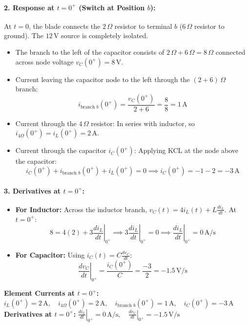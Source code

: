 \documentclass[11pt,a4paper,oneside]{article}
\begin{document}
\paragraph{2. Response at $t = 0^+$ (Switch at Position $b$):}
At $t=0$, the blade connects the $2\,\Omega$ resistor to terminal $b$ ($6\,\Omega$ resistor to ground). The $12\,\mathrm{V}$ source is completely isolated.
\begin{itemize}[leftmargin=1.5em]
  \item The branch to the left of the capacitor consists of $2\,\Omega + 6\,\Omega = 8\,\Omega$ connected across node voltage $v_C(0^+) = 8\,\mathrm{V}$.
  \item Current leaving the capacitor node to the left through the $(2+6)\,\Omega$ branch:
  \[
  i_{\text{branch } b}(0^+) = \frac{v_C(0^+)}{2 + 6} = \frac{8}{8} = 1\,\mathrm{A}
  \]
  \item Current through the $4\,\Omega$ resistor: In series with inductor, so $i_{4\Omega}(0^+) = i_L(0^+) = 2\,\mathrm{A}$.
  \item Current through the capacitor $i_C(0^+)$: Applying KCL at the node above the capacitor:
  \[
  i_C(0^+) + i_{\text{branch } b}(0^+) + i_L(0^+) = 0 \implies i_C(0^+) = -1 - 2 = -3\,\mathrm{A}
  \]
\end{itemize}

\paragraph{3. Derivatives at $t = 0^+$:}
\begin{itemize}[leftmargin=1.5em]
  \item \textbf{For Inductor:} Across the inductor branch, $v_C(t) = 4 i_L(t) + L \frac{di_L}{dt}$. At $t=0^+$:
  \[
  8 = 4(2) + 3 \left.\frac{di_L}{dt}\right|_{0^+} \implies 3 \left.\frac{di_L}{dt}\right|_{0^+} = 0 \implies \left.\frac{di_L}{dt}\right|_{0^+} = 0\,\mathrm{A/s}
  \]
  \item \textbf{For Capacitor:} Using $i_C(t) = C \frac{dv_C}{dt}$:
  \[
  \left.\frac{dv_C}{dt}\right|_{0^+} = \frac{i_C(0^+)}{C} = \frac{-3}{2} = -1.5\,\mathrm{V/s}
  \]
\end{itemize}

\begin{answerbox}
\textbf{Element Currents at $t=0^+$:} $i_L(0^+) = 2\,\mathrm{A}, \quad i_{4\Omega}(0^+) = 2\,\mathrm{A}, \quad i_{\text{branch } b}(0^+) = 1\,\mathrm{A}, \quad i_C(0^+) = -3\,\mathrm{A}$ \\
\textbf{Derivatives at $t=0^+$:} $\left.\frac{di_L}{dt}\right|_{0^+} = 0\,\mathrm{A/s}, \quad \left.\frac{dv_C}{dt}\right|_{0^+} = -1.5\,\mathrm{V/s}$
\end{answerbox}
\end{document}
